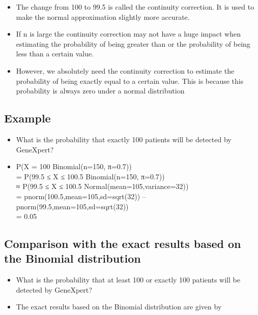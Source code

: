 \documentclass[
]{book}
\providecommand{\tightlist}{%
  \setlength{\itemsep}{0pt}\setlength{\parskip}{0pt}}
\begin{document}
\begin{itemize}
\tightlist
\item
  The change from 100 to 99.5 is called the continuity correction. It is used to make the normal approximation slightly more accurate.
\item
  If n is large the continuity correction may not have a huge impact when estimating the probability of being greater than or the probability of being less than a certain value.
\item
  However, we absolutely need the continuity correction to estimate the probability of being exactly equal to a certain value. This is because this probability is always zero under a normal distribution
\end{itemize}

\hypertarget{example-4}{%
\subsection{Example}\label{example-4}}

\begin{itemize}
\tightlist
\item
  What is the probability that exactly 100 patients will be detected by GeneXpert?
\item
  P(X = 100 \textbar{} Binomial(n=150, π=0.7))\\
  = P(99.5 ≤ X ≤ 100.5 \textbar Binomial(n=150, π=0.7))\\
  ≈ P(99.5 ≤ X ≤ 100.5 \textbar{} Normal(mean=105,variance=32))\\
  = pnorm(100.5,mean=105,sd=sqrt(32)) -- pnorm(99.5,mean=105,sd=sqrt(32))\\
  = 0.05
\end{itemize}

\hypertarget{comparison-with-the-exact-results-based-on-the-binomial-distribution}{%
\subsection{Comparison with the exact results based on the Binomial distribution}\label{comparison-with-the-exact-results-based-on-the-binomial-distribution}}

\begin{itemize}
\tightlist
\item
  What is the probability that at least 100 or exactly 100 patients will be detected by GeneXpert?
\item
  The exact results based on the Binomial distribution are given by
\end{itemize}
\end{document}

